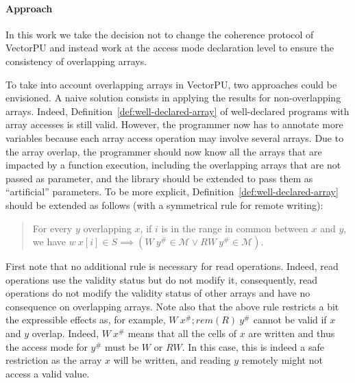 \documentclass[preprint,12pt]{elsarticle}
\newcommand{\symb}[1]{\textit{#1}}
\newcommand{\rem}[1]{\symb{rem}(#1)}
\newcommand{\abs}[1]{#1^\#}
\newcommand{\AM}{\mathcal{M}}
\begin{document}
\paragraph{Approach}
In this work we take the decision not to change the coherence protocol of VectorPU and instead work at the access mode declaration level to ensure the consistency of overlapping arrays.

To take into account overlapping arrays in VectorPU, two approaches could be envisioned. A naive solution consists in applying the results for non-overlapping arrays. Indeed, Definition~\ref{def:well-declared-array} of well-declared programs with array accesses is still valid. However,  the programmer now has to annotate more variables because each array access operation may involve several arrays. Due to the array overlap, the programmer should now know all the arrays that are impacted by a function execution, including the overlapping arrays that are not passed as parameter, and the library should be extended to pass them as ``artificial'' parameters. To be more explicit, Definition~\ref{def:well-declared-array} should be extended as follows (with a symmetrical rule for remote writing):

\begin{quote}
For every $y$ overlapping $x$, if $i$ is in the range in common between $x$ and $y$, we have $w\ x[i]\in S \implies (W\ \abs y \in \AM \lor RW\ \abs y \in \AM)$.
\end{quote}

First note that no additional rule is necessary for read operations. Indeed, read operations use the validity status but do not modify it, consequently, read operations do not modify the validity status of other arrays and have no consequence on overlapping arrays.
Note also that the above rule restricts a bit the expressible effects as, for example, $W\ \abs x ; \rem{R}\ \abs y$ cannot be valid if $x$ and $y$ overlap. Indeed, $W\ \abs x$ means that all the cells of $x$ are written and thus the access mode for $\abs y$ must be $W$ or $RW$. In this case, this is indeed a safe restriction as the array $x$ will be written, and reading $y$ remotely might not access a valid value.


%
\end{document}
